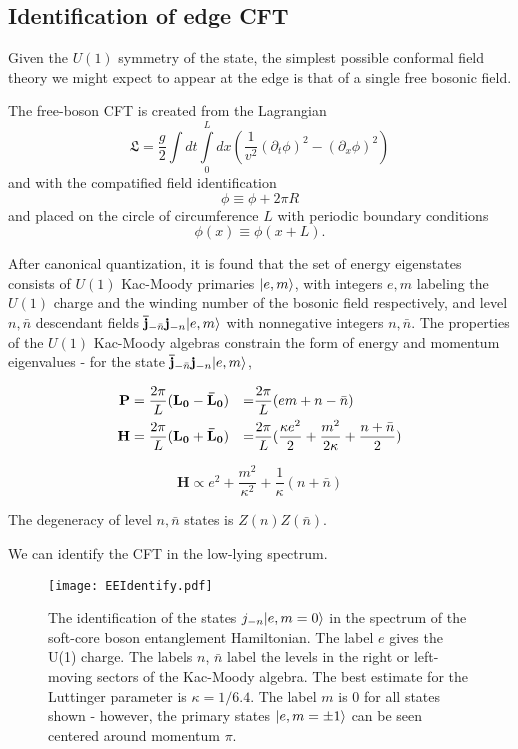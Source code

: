 \subsection{Identification of edge CFT}

Given the $U(1)$ symmetry of the state, the simplest possible conformal field theory we might expect to appear at the edge is that of a single free bosonic field. 

The free-boson CFT is created from the Lagrangian 
$$ \mathfrak{L} = \frac{g}{2}\int dt \int\limits_0^L dx ( \frac{1}{v^2}(\partial_t \phi)^2 - (\partial_x \phi)^2)$$
and with the compatified field identification
$$ \phi \equiv \phi + 2\pi R$$
and placed on the circle of circumference $L$ with periodic boundary conditions
$$ \phi(x) \equiv \phi(x+L).$$

After canonical quantization, it is found that the set of energy eigenstates consists of $U(1)$ Kac-Moody primaries $\vert e, m \rangle$, with integers $e, m$ labeling the $U(1)$ charge and the winding number of the bosonic field respectively, and level $n, \bar{n}$ descendant fields $\mathbf{\bar{j}}_{-\bar{n}} \mathbf{j}_{-n} \vert e, m \rangle$ with nonnegative integers $n, \bar{n}$. The properties of the $U(1)$ Kac-Moody algebras constrain the form of energy and momentum eigenvalues - for the state $\mathbf{\bar{j}}_{-\bar{n}} \mathbf{j}_{-n} \vert e, m \rangle$, 

\begin{align*}
	\mathbf{P} =\frac{2\pi}{L}&(\uL-\bL) 
	&=& \frac{2\pi}{L}(em + n - \bar{n}) \\
	\mathbf{H} = \frac{2\pi}{L}&(\uL+\bL) 
	&=& \frac{2\pi}{L}(\frac{\kappa e^2}{2} + \frac{m^2}{2 \kappa} + \frac{n + \bar{n}}{2}) %
\end{align*}

$$
\mathbf{H} \propto e^2 + \frac{m^2}{\kappa^2} + \frac{1}{\kappa}(n + \bar{n})
$$

The degeneracy of level $n, \bar{n}$ states is $Z(n) Z(\bar{n})$.



We can identify the CFT in the low-lying spectrum.

\begin{figure}[H]
	\centering
	\texttt{[image: EEIdentify.pdf]}
	\caption{The identification of the states $j_{-n}\vert e, m=0 \rangle$ in the spectrum of the soft-core boson entanglement Hamiltonian. The label $e$ gives the U(1) charge. The labels $n$, $\bar{n}$ label the levels in the right or left-moving sectors of the Kac-Moody algebra.  The best estimate for the Luttinger parameter is $\kappa = 1/6.4$. The label $m$ is 0 for all states shown - however, the primary states $\vert e, m=\pm 1 \rangle$ can be seen centered around momentum $\pi$.}
	\label{fig:primaries}
\end{figure}

